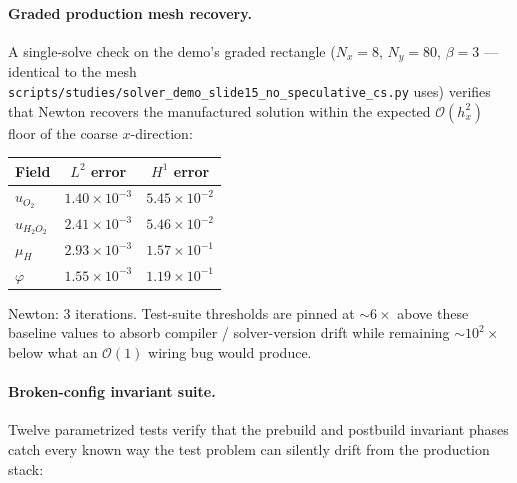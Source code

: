 \documentclass[11pt]{article}
\begin{document}
\paragraph{Graded production mesh recovery.} A single-solve check on
the demo's graded rectangle ($N_x = 8$, $N_y = 80$, $\beta = 3$ ---
identical to the mesh
\verb|scripts/studies/solver_demo_slide15_no_speculative_cs.py|
uses) verifies that Newton recovers the manufactured solution within
the expected $\mathcal{O}(h_x^2)$ floor of the coarse $x$-direction:

\begin{center}
\begin{tabular}{lcc}
\toprule
Field & $L^2$ error & $H^1$ error \\
\midrule
$u_{O_2}$     & $1.40{\times}10^{-3}$ & $5.45{\times}10^{-2}$ \\
$u_{H_2O_2}$  & $2.41{\times}10^{-3}$ & $5.46{\times}10^{-2}$ \\
$\mu_H$       & $2.93{\times}10^{-3}$ & $1.57{\times}10^{-1}$ \\
$\varphi$     & $1.55{\times}10^{-3}$ & $1.19{\times}10^{-1}$ \\
\bottomrule
\end{tabular}
\end{center}

Newton: $3$ iterations.  Test-suite thresholds are pinned at $\sim 6\times$
above these baseline values to absorb compiler / solver-version drift while
remaining $\sim 10^2\times$ below what an $\mathcal{O}(1)$ wiring bug would
produce.

\paragraph{Broken-config invariant suite.} Twelve parametrized tests
verify that the prebuild and postbuild invariant phases catch every
known way the test problem can silently drift from the production
stack:
\end{document}
